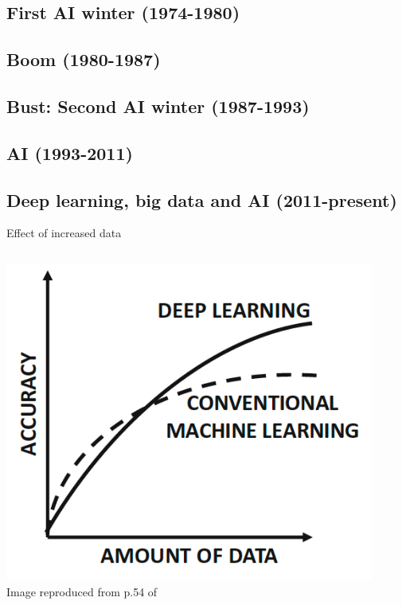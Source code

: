 \subsection{First AI winter (1974-1980)}
\subsection{Boom (1980-1987)}
\subsection{Bust: Second AI winter (1987-1993)}
\subsection{AI (1993-2011)}
\subsection{Deep learning, big data and AI (2011-present)}


%
%
%

\begin{frame}[t]{Effect of increased data}

    \begin{columns}
        \begin{column}{0.50\textwidth}
         \begin{center}
          \includegraphics[width=0.95\textwidth]{./images/dl_intro/accuracy_vs_amount_of_data_1.png}\\
          {\scriptsize \color{col:attribution} 
          Image reproduced from p.54 of \cite{Aggarwal:2018SpringerDL}}\\
         \end{center}
        \end{column}
        \begin{column}{0.50\textwidth}
        \end{column}
    \end{columns}


\end{frame}

